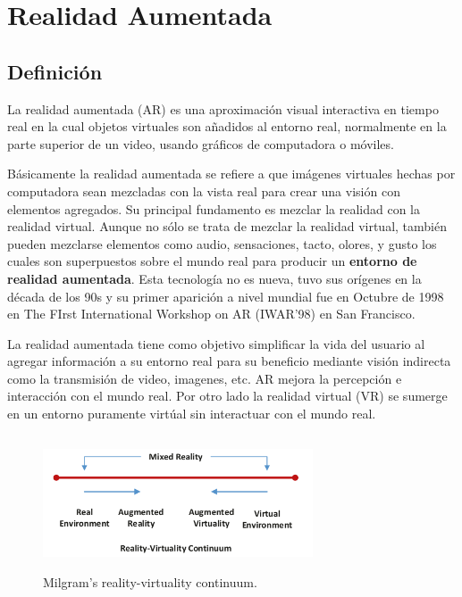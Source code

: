 \newpage
\section{Realidad Aumentada}
\setcounter{secnumdepth}{2}

\subsection{Definición}
La realidad aumentada (AR) es una aproximación visual interactiva en tiempo real en la cual objetos virtuales son añadidos al entorno real, normalmente en la parte superior de un video, usando gráficos de computadora o móviles.\cite{B04} \par
\vspace{5mm}
Básicamente la realidad aumentada se refiere a que imágenes virtuales hechas por computadora sean mezcladas con la vista real para crear una visión con elementos agregados. Su principal fundamento es mezclar la realidad con la realidad virtual. Aunque no sólo se trata de mezclar la realidad virtual, también pueden mezclarse elementos como audio, sensaciones, tacto, olores, y gusto los cuales son superpuestos sobre el mundo real para producir un \textbf{entorno de realidad aumentada}.\cite{B05}
Esta tecnología no es nueva, tuvo sus orígenes en la década de los 90s\cite{B04} y su primer aparición a nivel mundial fue en Octubre de 1998 en The FIrst International Workshop on AR (IWAR'98) en San Francisco\cite{B05}.\par 
\vspace{5mm}
La realidad aumentada tiene como objetivo simplificar la vida del usuario al agregar información a su entorno real para su beneficio mediante visión indirecta como la transmisión de video, imagenes, etc. AR mejora la percepción e interacción con el mundo real. Por otro lado la realidad virtual (VR) se sumerge en un entorno puramente virtúal sin interactuar con el mundo real.\cite{BXX}\par
\begin{figure}[h!]
	\centering
	\includegraphics[width=8cm,height=4cm]{imagenes/marcoteorico/ar/metaversecontinuum.png}
	\caption{Milgram’s reality-virtuality continuum.\cite{BXX}}
	\label{fig:analogo}
\end{figure}
